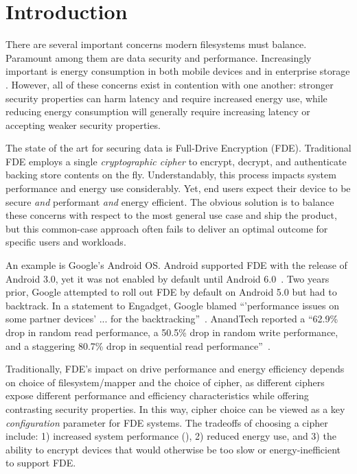 \section{Introduction}\label{sec:introduction}

There are several important concerns modern filesystems must balance. Paramount
among them are data security and performance. Increasingly important is energy
consumption in both mobile devices and in enterprise storage
\cite{android-M-mobile-motivation, enterprise-motivation}. However, all of these
concerns exist in contention with one another: stronger security properties can
harm latency and require increased energy use, while reducing energy consumption
will generally require increasing latency or accepting weaker security
properties.

The state of the art for securing data is Full-Drive Encryption (FDE).
Traditional FDE employs a single \emph{cryptographic cipher} to encrypt,
decrypt, and authenticate backing store contents on the fly. Understandably,
this process impacts system performance and energy use considerably. Yet, end
users expect their device to be secure \emph{and} performant \emph{and} energy
efficient. The obvious solution is to balance these concerns with respect to the
most general use case and ship the product, but this common-case approach often
fails to deliver an optimal outcome for specific users and workloads.

An example is Google's Android OS. Android supported FDE with the release of
Android 3.0, yet it was not enabled by default until Android
6.0~\cite{android-M-mobile-motivation}. Two years prior, Google attempted to
roll out FDE by default on Android 5.0 but had to backtrack. In a statement to
Engadget, Google blamed ``'performance issues on some partner devices' ... for
the backtracking''~\cite{google-engadget}. AnandTech reported a ``62.9\% drop in
random read performance, a 50.5\% drop in random write performance, and a
staggering 80.7\% drop in sequential read
performance''~\cite{android-M-mobile-motivation-2}.

Traditionally, FDE's impact on drive performance and energy efficiency depends
on choice of filesystem/mapper and the choice of cipher, as different ciphers
expose different performance and efficiency characteristics while offering
contrasting security properties. In this way, cipher choice can be viewed as a
key \emph{configuration} parameter for FDE systems. The tradeoffs of choosing a
cipher include: 1) increased system performance (), 2) reduced energy use, and 3) the ability to encrypt devices that
would otherwise be too slow or energy-inefficient to support FDE.

